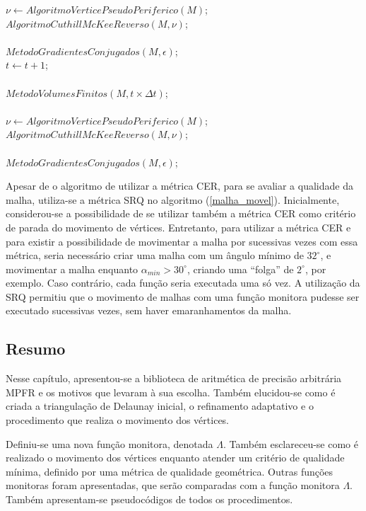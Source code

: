 \begin{algorithm}
{{{	  $\nu \leftarrow AlgoritmoVerticePseudoPeriferico(M)$; \\
	  $AlgoritmoCuthillMcKeeReverso(M, \nu)$; \\      		
	    \\ 
	  $MetodoGradientesConjugados(M, \epsilon)$; \\    	
        }	
	$t \leftarrow t + 1$;   \\ 
	  \\ 
	$MetodoVolumesFinitos(M, t \times \Delta t)$; \\
	  \\
	$\nu \leftarrow AlgoritmoVerticePseudoPeriferico(M)$; \\
	$AlgoritmoCuthillMcKeeReverso(M, \nu)$; \\ 
	  \\ 
	$MetodoGradientesConjugados(M, \epsilon)$; \\ 
    }
}
\end{algorithm}  

Apesar de o algoritmo de  utilizar a métrica CER, para se avaliar a qualidade da malha, utiliza-se a métrica SRQ no algoritmo (\ref{malha_movel}). Inicialmente, considerou-se a possibilidade de se utilizar também a métrica CER como critério de parada do movimento de vértices. Entretanto, para utilizar a métrica CER e para existir a possibilidade de movimentar a malha por sucessivas vezes com essa métrica, seria necessário criar uma malha com um ângulo mínimo de $32^{\circ}$, e movimentar a malha enquanto $\alpha_{min} > 30^{\circ}$, criando uma ``folga'' de $2^{\circ}$, por exemplo. Caso contrário, cada função seria executada uma só vez. A utilização da SRQ permitiu que o movimento de malhas com uma função monitora pudesse ser executado sucessivas vezes, sem haver emaranhamentos da malha.


\subsection{Resumo}
\label{cap_consideracoes_finais}

Nesse capítulo, apresentou-se a biblioteca de aritmética de precisão arbitrária MPFR e os motivos que levaram à sua escolha. Também elucidou-se como é criada a triangulação de Delaunay inicial, o refinamento adaptativo e o procedimento que realiza o movimento dos vértices. 

Definiu-se uma nova função monitora, denotada $\Lambda$. Também esclareceu-se como é realizado o movimento dos vértices enquanto atender um critério de qualidade mínima, definido por uma métrica de qualidade geométrica. Outras funções monitoras foram apresentadas, que serão comparadas com a função monitora $\Lambda$. Também apresentam-se pseudocódigos de todos os procedimentos.
